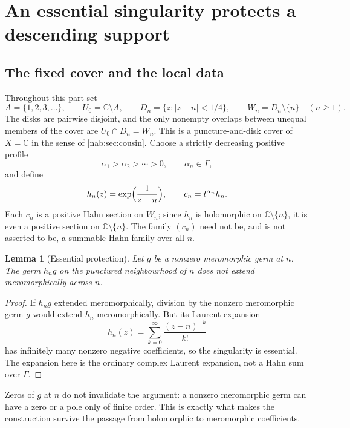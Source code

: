 \documentclass[11pt,letterpaper]{article}
\newtheorem{lemma}[lemma]{Lemma}
\theoremstyle{definition}
\theoremstyle{remark}
\newcommand{\C}{\mathbb C}
\numberwithin{equation}{section}
\begin{document}
\section{An essential singularity protects a descending support}
\label{nab:loc:sec:obstruction}

\subsection{The fixed cover and the local data}

Throughout this part set
\[
 A=\{1,2,3,\ldots\},\qquad U_0=\C\setminus A,\qquad
 D_n=\{z:|z-n|<1/4\},\qquad W_n=D_n\setminus\{n\}\quad(n\geq1).
\]
The disks are pairwise disjoint, and the only nonempty overlaps between
unequal members of the cover are $U_0\cap D_n=W_n$. This is a
puncture-and-disk cover of $X=\C$ in the sense of \cref{nab:sec:cousin}. Choose
a strictly decreasing positive profile
\begin{equation}\label{nab:loc:eq:profile}
 \alpha_1>\alpha_2>\cdots>0,\qquad \alpha_n\in\Gamma,
\end{equation}
and define
\begin{equation}\label{nab:loc:eq:cocycle}
 h_n(z)=\exp\Bigl(\frac1{z-n}\Bigr),\qquad c_n=t^{\alpha_n}h_n.
\end{equation}
Each $c_n$ is a positive Hahn section on $W_n$; since $h_n$ is holomorphic on
$\C\setminus\{n\}$, it is even a positive section on $\C\setminus\{n\}$. The
family $(c_n)$ need not be, and is not asserted to be, a summable Hahn family
over all $n$.

\begin{lemma}[Essential protection]\label{nab:loc:lem:essential}
Let $g$ be a nonzero meromorphic germ at $n$. The germ $h_ng$ on the punctured
neighbourhood of $n$ does not extend meromorphically across $n$.
\end{lemma}

\begin{proof}
If $h_ng$ extended meromorphically, division by the nonzero meromorphic germ
$g$ would extend $h_n$ meromorphically. But its Laurent expansion
\[
 h_n(z)=\sum_{k=0}^{\infty}\frac{(z-n)^{-k}}{k!}
\]
has infinitely many nonzero negative coefficients, so the singularity is
essential. The expansion here is the ordinary complex Laurent expansion, not a
Hahn sum over $\Gamma$.
\end{proof}

Zeros of $g$ at $n$ do not invalidate the argument: a nonzero meromorphic germ
can have a zero or a pole only of finite order. This is exactly what makes the
construction survive the passage from holomorphic to meromorphic coefficients.
\end{document}
